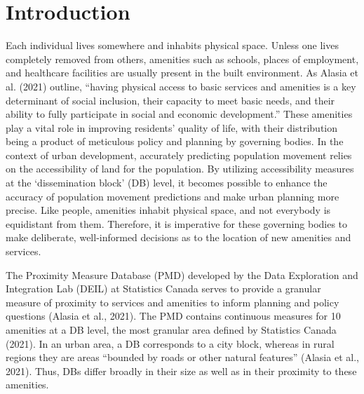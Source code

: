 \documentclass[11pt, a4paper]{article}
\begin{document}
\section{Introduction}
\par
Each individual lives somewhere and inhabits physical space. Unless one lives completely removed from others, amenities such as schools, places of employment, and healthcare facilities are usually present in the built environment. As Alasia et al. (2021) outline, ``having physical access to basic services and amenities is a key determinant of social inclusion, their capacity to meet basic needs, and their ability to fully participate in social and economic development.'' These amenities play a vital role in improving residents' quality of life, with their distribution being a product of meticulous policy and planning by governing bodies. In the context of urban development, accurately predicting population movement relies on the accessibility of land for the population. By utilizing accessibility measures at the `dissemination block' (DB) level, it becomes possible to enhance the accuracy of population movement predictions and make urban planning more precise. Like people, amenities inhabit physical space, and not everybody is equidistant from them. Therefore, it is imperative for these governing bodies to make deliberate, well-informed decisions as to the location of new amenities and services.
\par
The Proximity Measure Database (PMD) developed by the Data Exploration and Integration Lab (DEIL) at Statistics Canada serves to provide a granular measure of proximity to services and amenities to inform planning and policy questions (Alasia et al., 2021). The PMD contains continuous measures for 10 amenities at a DB level, the most granular area defined by Statistics Canada (2021). In an urban area, a DB corresponds to a city block, whereas in rural regions they are areas ``bounded by roads or other natural features'' (Alasia et al., 2021). Thus, DBs differ broadly in their size as well as in their proximity to these amenities.
\par
\end{document}
